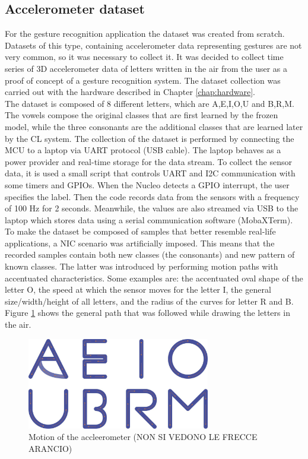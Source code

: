 \documentclass[12pt]{report}
\begin{document}
\subsection{Accelerometer dataset}
For the gesture recognition application the dataset was created from scratch. Datasets of this type, containing accelerometer data representing gestures are not very common, so it was necessary to collect it. It was decided to collect time series of 3D accelerometer data of letters written in the air from the user as a proof of concept of a gesture recognition system.
The dataset collection was carried out with the hardware described in Chapter \ref{chap:hardware}. \\
The dataset is composed of 8 different letters, which are A,E,I,O,U and B,R,M. The vowels compose the original classes that are first learned by the frozen model, while the three consonants are the additional classes that are learned later by the CL system. The collection of the dataset is performed by connecting the MCU to a laptop via UART protocol (USB cable). The laptop behaves as a power provider and real-time storage for the data stream. 
To collect the sensor data, it is used a small script that controls UART and I2C communication with some timers and GPIOs. When the Nucleo detects a GPIO interrupt, the user specifies the label. Then the code records data from the sensors with a frequency of 100 Hz for 2 seconds. Meanwhile, the values are also streamed via USB to the laptop which stores data using a serial communication software (MobaXTerm). \\
To make the dataset be composed of samples that better resemble real-life applications, a NIC scenario was artificially imposed. This means that the recorded samples contain both new classes (the consonants) and new pattern of known classes. The latter was introduced by performing motion paths with accentuated characteristics. Some examples are: the accentuated oval shape of the letter O, the speed at which the sensor moves for the letter I, the general size/width/height of all letters, and the radius of the curves for letter R and B.
Figure \ref{fig:letters_motion} shows the general path that was followed while drawing the letters in the air.\\

\begin{figure}[h!]
    \centering
    \includegraphics[width=80mm]{Figures/Chapter4/letters_motion.jpg} 
    \caption{Motion of the accleerometer (NON SI VEDONO LE FRECCE ARANCIO)}
    \label{fig:letters_motion}    
\end{figure}
\end{document}
